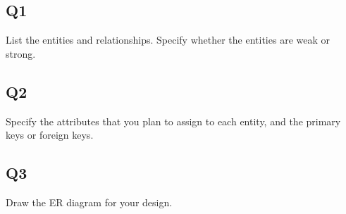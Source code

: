 \documentclass{homework}
\begin{document}
\subsection*{Q1} List the entities and relationships. Specify whether the entities are weak or strong. 
\subsection*{Q2} Specify the attributes that you plan to assign to each entity, and the primary keys or foreign keys. 
\subsection*{Q3} Draw the ER diagram for your design.








\end{document}

